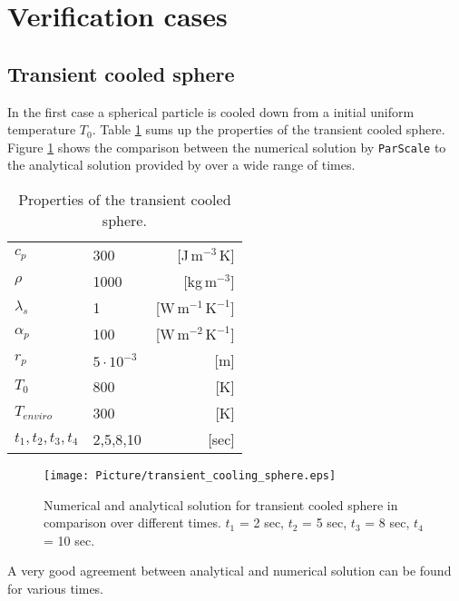 \documentclass{particles2015}
\begin{document}
\section{Verification cases}
\label{sec:verification_case}

\subsection{Transient cooled sphere}
\label{sec:transient_cooling}
In the first  case a spherical particle is cooled down from a initial uniform temperature $T_0$. Table \ref{tab:properties_cooling_sphere} sums up the properties of the transient cooled sphere. Figure \ref{fig:Cooling_sphere} shows the comparison between the numerical solution by \texttt{ParScale} to the analytical solution provided by \cite{Crank1975} over a wide range of times. 

\begin{table}[h]
  \centering 
  \caption{Properties of the transient cooled sphere.}
   \begin{tabular}{llr}
      \hline 
        $c_p$                   &300       & [J$\,\text{m}^{-3}\,$K]\\   
       	$\rho$					&1000	   & [kg$\, \text{m}^{-3}$]\\
        $\lambda_s$				&1		   & [W$\, \text{m}^{-1} \,\text{K}^{-1}$]\\
        $\alpha_p$ 				&100	   & [W$\, \text{m}^{-2} \,\text{K}^{-1}$]\\
        $r_p$					&$5\cdot 10^{-3}$ & [m]\\
        $ T_0$					& 800& [K] \\
        $T_{enviro}$			& 300& [K]\\
        $t_1,t_2,t_3,t_4$ 		& 2,5,8,10 & [sec]\\
      \hline      
       \end{tabular}
   \setlength{\belowcaptionskip}{12pt}
   \label{tab:properties_cooling_sphere}
\end{table}


\begin{figure}[h!]
   \centering
   \texttt{[image: Picture/transient\_cooling\_sphere.eps]}
   \caption{Numerical and analytical solution for transient cooled sphere in comparison over different times. $t_1$ = 2 sec, $t_2$ = 5 sec, $t_3$ = 8 sec, $t_4$ = 10 sec.}
   \label{fig:Cooling_sphere}
\end{figure}

A very good agreement between analytical and numerical solution can be found for various times. 
\end{document}

